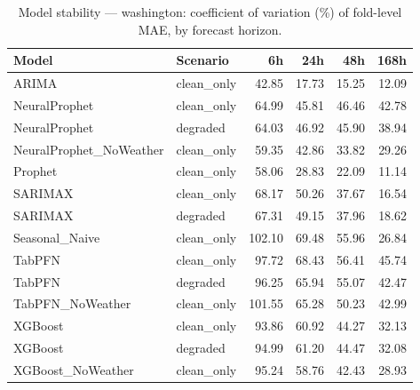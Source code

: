 \begin{table}[h]
\centering
\caption{Model stability — washington: coefficient of variation (\%) of fold-level MAE, by forecast horizon.}
\label{tab:stability_washington}
\begin{tabular}{llrrrr}
\toprule
Model & Scenario & 6h & 24h & 48h & 168h \\
\midrule
ARIMA & clean\_only & 42.85 & 17.73 & 15.25 & 12.09 \\
NeuralProphet & clean\_only & 64.99 & 45.81 & 46.46 & 42.78 \\
NeuralProphet & degraded & 64.03 & 46.92 & 45.90 & 38.94 \\
NeuralProphet\_NoWeather & clean\_only & 59.35 & 42.86 & 33.82 & 29.26 \\
Prophet & clean\_only & 58.06 & 28.83 & 22.09 & 11.14 \\
SARIMAX & clean\_only & 68.17 & 50.26 & 37.67 & 16.54 \\
SARIMAX & degraded & 67.31 & 49.15 & 37.96 & 18.62 \\
Seasonal\_Naive & clean\_only & 102.10 & 69.48 & 55.96 & 26.84 \\
TabPFN & clean\_only & 97.72 & 68.43 & 56.41 & 45.74 \\
TabPFN & degraded & 96.25 & 65.94 & 55.07 & 42.47 \\
TabPFN\_NoWeather & clean\_only & 101.55 & 65.28 & 50.23 & 42.99 \\
XGBoost & clean\_only & 93.86 & 60.92 & 44.27 & 32.13 \\
XGBoost & degraded & 94.99 & 61.20 & 44.47 & 32.08 \\
XGBoost\_NoWeather & clean\_only & 95.24 & 58.76 & 42.43 & 28.93 \\
\bottomrule
\end{tabular}
\end{table}
